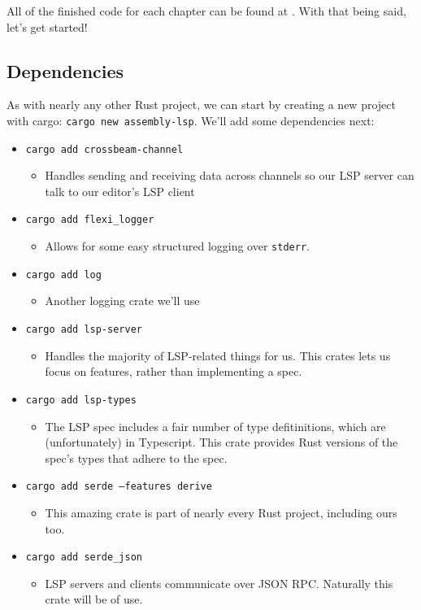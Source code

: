 All of the finished code for each chapter can be found at \href{\URL}{\URL}. With that being said,
let's get started!

\subsection{Dependencies}

As with nearly any other Rust project, we can start by creating a new project with
cargo: \texttt{cargo new assembly-lsp}. We'll add some dependencies next:

\begin{itemize}
	\item \texttt{cargo add crossbeam-channel}
	      \begin{itemize}
		      \item Handles sending and receiving data across channels so our LSP server
		            can talk to our editor's LSP client
	      \end{itemize}
	\item \texttt{cargo add flexi\_logger}
	      \begin{itemize}
		      \item Allows for some easy structured logging over \texttt{stderr}.
	      \end{itemize}
	\item \texttt{cargo add log}
	      \begin{itemize}
		      \item Another logging crate we'll use
	      \end{itemize}
	\item \texttt{cargo add lsp-server}
	      \begin{itemize}
		      \item Handles the majority of LSP-related things for us. This crates
		            lets us focus on features, rather than implementing a spec.
	      \end{itemize}
	\item \texttt{cargo add lsp-types}
	      \begin{itemize}
		      \item The LSP spec includes a fair number of type defitinitions, which
		            are (unfortunately) in Typescript. This crate provides Rust versions
		            of the spec's types that adhere to the spec.
	      \end{itemize}
	\item \texttt{cargo add serde --features derive}
	      \begin{itemize}
		      \item This amazing crate is part of nearly every Rust project, including
		            ours too.
	      \end{itemize}
	\item \texttt{cargo add serde\_json}
	      \begin{itemize}
		      \item LSP servers and clients communicate over JSON RPC. Naturally this
		            crate will be of use.
	      \end{itemize}
\end{itemize}

